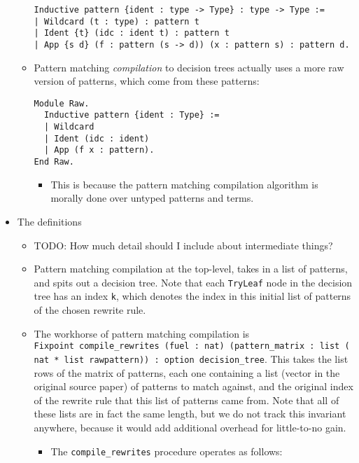 \documentclass[
]{article}
\providecommand{\tightlist}{%
  \setlength{\itemsep}{0pt}\setlength{\parskip}{0pt}}
\begin{document}
\begin{itemize}
\begin{itemize}
\begin{verbatim}
Inductive pattern {ident : type -> Type} : type -> Type :=
| Wildcard (t : type) : pattern t
| Ident {t} (idc : ident t) : pattern t
| App {s d} (f : pattern (s -> d)) (x : pattern s) : pattern d.
\end{verbatim}
  \item
    Pattern matching \emph{compilation} to decision trees actually uses
    a more raw version of patterns, which come from these patterns:

\begin{verbatim}
Module Raw.
  Inductive pattern {ident : Type} :=
  | Wildcard
  | Ident (idc : ident)
  | App (f x : pattern).
End Raw.
\end{verbatim}

    \begin{itemize}
    \tightlist
    \item
      This is because the pattern matching compilation algorithm is
      morally done over untyped patterns and terms.
    \end{itemize}
  \end{itemize}
\item
  The definitions

  \begin{itemize}
  \tightlist
  \item
    TODO: How much detail should I include about intermediate things?
  \item
    Pattern matching compilation at the top-level, takes in a list of
    patterns, and spits out a decision tree. Note that each
    \texttt{TryLeaf} node in the decision tree has an index \texttt{k},
    which denotes the index in this initial list of patterns of the
    chosen rewrite rule.
  \item
    The workhorse of pattern matching compilation is
    \texttt{Fixpoint\ compile\_rewrites\textquotesingle{}\ (fuel\ :\ nat)\ (pattern\_matrix\ :\ list\ (nat\ *\ list\ rawpattern))\ :\ option\ decision\_tree}.
    This takes the list rows of the matrix of patterns, each one
    containing a list (vector in the original source paper) of patterns
    to match against, and the original index of the rewrite rule that
    this list of patterns came from. Note that all of these lists are in
    fact the same length, but we do not track this invariant anywhere,
    because it would add additional overhead for little-to-no gain.

    \begin{itemize}
    \tightlist
    \item
      The \texttt{compile\_rewrites\textquotesingle{}} procedure
      operates as follows:


\end{itemize}
\end{itemize}
\end{itemize}
\end{document}

